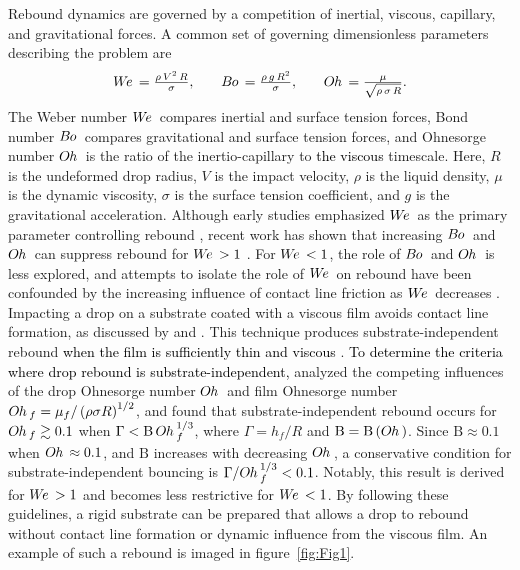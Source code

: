 \documentclass{jfm}
\newcommand{\edit}[1]{\textcolor{black}{#1}}
\newcommand{\We}{W\kern-0.15em e\,}
\newcommand{\Bo}{B\kern-0.05em o\,}
\newcommand{\Oh}{O\kern-0.05em h\,}
\begin{document}
Rebound dynamics are governed by a competition of inertial, viscous, capillary, and gravitational forces. A common set of governing dimensionless parameters describing the problem are
\begin{equation}\label{eqn:dimensionlessparameters}
\begin{array}{ccc}
\quad \We = \frac{\rho \, V^2 \, R}{\sigma}, & \quad
\Bo = \frac{\rho \,g \, R^2}{\sigma}, & \quad
\Oh = \frac{\mu}{\sqrt{\rho \,\sigma \, R}}. \quad
\end{array}
\end{equation}
The Weber number $\We$ compares inertial and surface tension forces, Bond number $\Bo$ compares gravitational and surface tension forces, and Ohnesorge number $\Oh$ is the ratio of the inertio-capillary to \edit{the viscous} timescale. Here, $R$ is the undeformed drop radius, $V$ is the impact velocity, $\rho$ is the liquid density, $\mu$ is the dynamic viscosity, $\sigma$ is the surface tension coefficient, and $g$ is the gravitational acceleration. Although early studies emphasized $\We$ as the primary parameter controlling rebound \citep{foote1975water,anders1993velocity,richard2000bouncing,richard2002contact,okumura2003water}, recent work has shown that increasing $\Bo$ and $\Oh$ can suppress rebound for $\We>1$ \citep{jha2020viscous,sanjay2023does}. For $\We<1$, the role of $\Bo$ and $\Oh$ is less explored, and attempts to isolate the role of $\We$ on rebound have been confounded by the increasing influence of contact line friction as $\We$ decreases \citep{wang2022successive,thenarianto2023energy}. Impacting a drop on a substrate coated with a viscous film avoids contact line formation, as discussed by \citet{gilet2008dynamics} and \citet{gilet2012droplets}. This technique produces substrate-independent rebound \edit{when the film is sufficiently thin and viscous} \citep{hao2015superhydrophobic}. \edit{To determine the criteria where drop rebound is substrate-independent,} \citet{sanjay2023drop} analyzed the competing influences of the drop Ohnesorge number $\Oh$ and film Ohnesorge number $\Oh_{f}=\mu_{f} / \left( \rho \sigma R \right)^{1/2}$, and found that substrate-independent rebound occurs for $\Oh_{f} \gtrsim 0.1$ when $\Gamma < \textrm{B} \, \Oh_{f}^{1/3}$, where $\Gamma = h_{f}/R$ and $\textrm{B} = \textrm{B} \left( \Oh \right)$. Since $\textrm{B} \approx 0.1$ when $\Oh \approx 0.1$, and $\textrm{B}$ increases with decreasing $\Oh$, a conservative condition for substrate-independent bouncing is $\Gamma/\Oh_{f}^{1/3} < 0.1$. Notably, this result is derived for $\We >1$ and becomes less restrictive for $\We < 1$. By following these guidelines, a rigid substrate can be prepared that allows a drop to rebound without contact line formation or dynamic influence from the viscous film. An example of such a rebound is imaged in figure~\ref{fig:Fig1}. 
\end{document}
